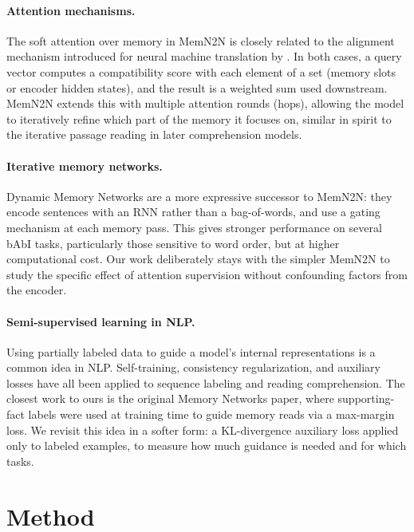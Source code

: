 \documentclass{article} %
\begin{document}
\paragraph{Attention mechanisms.}
The soft attention over memory in MemN2N is closely related to the alignment mechanism introduced for neural machine translation by \citet{bahdanau2015neural}. In both cases, a query vector computes a compatibility score with each element of a set (memory slots or encoder hidden states), and the result is a weighted sum used downstream. MemN2N extends this with multiple attention rounds (hops), allowing the model to iteratively refine which part of the memory it focuses on, similar in spirit to the iterative passage reading in later comprehension models.

\paragraph{Iterative memory networks.}
Dynamic Memory Networks \citep{kumar2016ask} are a more expressive successor to MemN2N: they encode sentences with an RNN rather than a bag-of-words, and use a gating mechanism at each memory pass. This gives stronger performance on several bAbI tasks, particularly those sensitive to word order, but at higher computational cost. Our work deliberately stays with the simpler MemN2N to study the specific effect of attention supervision without confounding factors from the encoder.

\paragraph{Semi-supervised learning in NLP.}
Using partially labeled data to guide a model's internal representations is a common idea in NLP. Self-training, consistency regularization, and auxiliary losses have all been applied to sequence labeling and reading comprehension. The closest work to ours is the original Memory Networks paper, where supporting-fact labels were used at training time to guide memory reads via a max-margin loss. We revisit this idea in a softer form: a KL-divergence auxiliary loss applied only to labeled examples, to measure how much guidance is needed and for which tasks.


\section{Method}
\label{sec:method}
\end{document}
